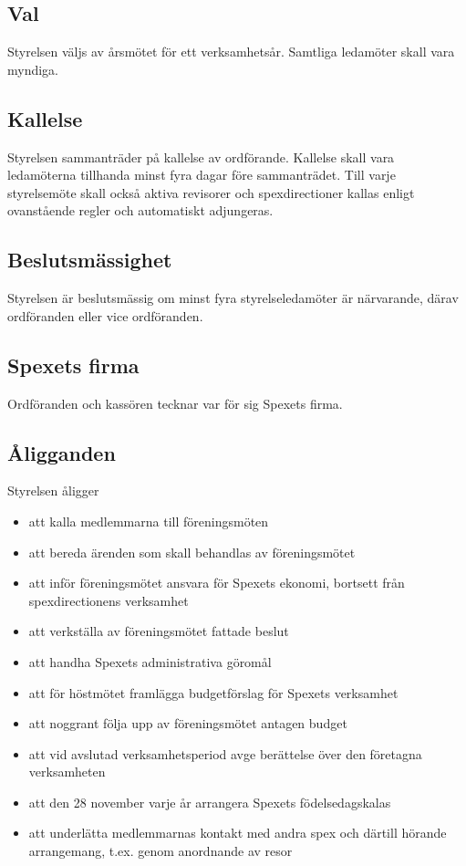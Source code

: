 \documentclass[a4paper]{article}
\begin{document}
\subsection{Val}
Styrelsen väljs av årsmötet för ett verksamhetsår. Samtliga ledamöter skall vara myndiga.

\subsection{Kallelse}
Styrelsen sammanträder på kallelse av ordförande. Kallelse skall vara ledamöterna tillhanda minst fyra dagar före sammanträdet. Till varje styrelsemöte skall också aktiva revisorer och spexdirectioner kallas enligt ovanstående regler och automatiskt adjungeras.

\subsection{Beslutsmässighet}
Styrelsen är beslutsmässig om minst fyra styrelseledamöter är närvarande, därav ordföranden eller vice ordföranden.

\subsection{Spexets firma}
Ordföranden och kassören tecknar var för sig Spexets firma.

\subsection{Åligganden}
Styrelsen åligger

\begin{itemize}
  \item att kalla medlemmarna till föreningsmöten
  \item att bereda ärenden som skall behandlas av föreningsmötet
  \item att inför föreningsmötet ansvara för Spexets ekonomi, bortsett från spexdirectionens verksamhet
  \item att verkställa av föreningsmötet fattade beslut
  \item att handha Spexets administrativa göromål
  \item att för höstmötet framlägga budgetförslag för Spexets verksamhet
  \item att noggrant följa upp av föreningsmötet antagen budget
  \item att vid avslutad verksamhetsperiod avge berättelse över den företagna verksamheten
  \item att den 28 november varje år arrangera Spexets födelsedagskalas
  \item att underlätta medlemmarnas kontakt med andra spex och därtill hörande arrangemang, t.ex. genom anordnande av resor
\end{itemize}
\end{document}
